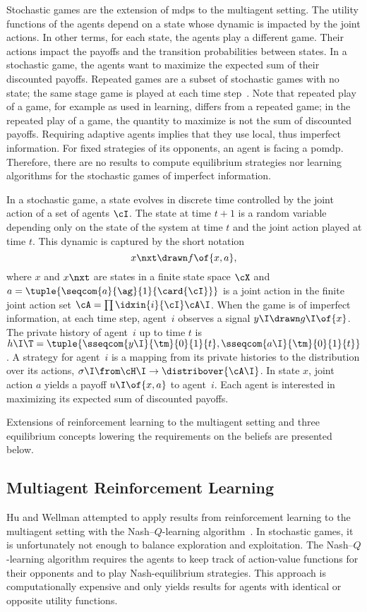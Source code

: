 Stochastic games are the extension of \acp{mdp} to the multiagent setting.
The utility functions of the agents depend on a state whose dynamic is impacted by the joint actions.
In other terms, for each state, the agents play a different game.
Their actions impact the payoffs and the transition probabilities between states.
In a stochastic game, the agents want to maximize the expected sum of their discounted payoffs.
Repeated games are a subset of stochastic games with no state; the same stage game is played at each time step~\cite{mailath_samuelson:2006}.
Note that repeated play of a game, for example as used in learning, differs from a repeated game; in the repeated play of a game, the quantity to maximize is not the sum of discounted payoffs.
Requiring adaptive agents implies that they use local, thus imperfect information.
For fixed strategies of its opponents, an agent is facing a \ac{pomdp}.
Therefore, there are no results to compute equilibrium strategies nor learning algorithms for the stochastic games of imperfect information.

In a stochastic game, a state evolves in discrete time controlled by the joint action of a set of agents \(\cI\).
The state at time \(t+1\) is a random variable depending only on the state of the system at time \(t\) and the joint action played at time \(t\).
This dynamic is captured by the short notation
\begin{equation}
\label{eq:stochastic_game_dynamic}
x\nxt \drawn f \of {x, a},
\end{equation}
where \(x\) and \(x\nxt\) are states in a finite state space \(\cX\) and \(a = \tuple{\seqcom{a}{\ag}{1}{\card{\cI}}}\) is a joint action in the finite joint action set \(\cA = \prod\idxin{i}{\cI} \cA\I\).
When the game is of imperfect information, at each time step, agent~\(i\) observes a signal \(y\I \drawn g\I \of {x}\).
The private history of agent~\(i\) up to time \(t\) is \(h\I\T = \tuple{\sseqcom{y\I}{\tm}{0}{1}{t}, \sseqcom{a\I}{\tm}{0}{1}{t}} \).
A strategy for agent~\(i\) is a mapping from its private histories to the distribution over its actions, \(\sigma\I \from \cH\I \to \distribover{\cA\I}\).
In state \(x\), joint action \(a\) yields a payoff \(u\I \of {x, a}\) to agent~\(i\).
Each agent is interested in maximizing its expected sum of discounted payoffs.

Extensions of reinforcement learning to the multiagent setting and three equilibrium concepts lowering the requirements on the beliefs are presented below.

\subsection{Multiagent Reinforcement Learning}
Hu and Wellman attempted to apply results from reinforcement learning to the multiagent setting with the Nash--\(Q\)-learning algorithm~\cite{hu_wellman:2003}.
In stochastic games, it is unfortunately not enough to balance exploration and exploitation.
The Nash--\(Q\)-learning algorithm requires the agents to keep track of action-value functions for their opponents and to play Nash-equilibrium strategies.
This approach is computationally expensive and only yields results for agents with identical or opposite utility functions.

